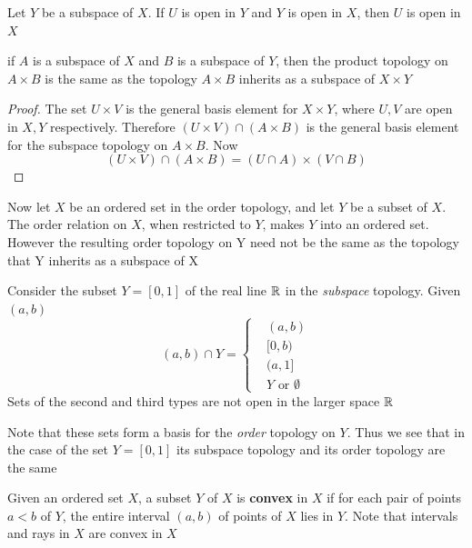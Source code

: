 \documentclass[11pt]{article}
\begin{document}
\begin{lemma}[]
Let \(Y\) be a subspace of \(X\). If \(U\) is open in \(Y\) and \(Y\) is open in \(X\),
then \(U\) is open in \(X\)
\end{lemma}

\begin{theorem}[]
if \(A\) is a subspace of \(X\) and \(B\) is a subspace of \(Y\), then the product topology
on \(A\times B\) is the same as the topology \(A\times B\) inherits as a subspace of \(X\times Y\)
\end{theorem}

\begin{proof}
The set \(U\times V\) is the general basis element for \(X\times Y\), where \(U,V\) are open in \(X,Y\)
respectively.  Therefore \((U\times V)\cap(A\times B)\) is the general basis element for the subspace
topology on \(A\times B\). Now
 \begin{equation*}
(U\times V)\cap(A\times B)=(U\cap A)\times (V\cap B)
 \end{equation*}
\end{proof}

Now let \(X\) be an ordered set in the order topology, and let \(Y\) be a subset of \(X\). The
order relation on \(X\), when restricted to \(Y\), makes \(Y\) into an ordered set. However the
resulting order topology on Y need not be the same as the topology that Y inherits as a subspace
of X

\begin{examplle}[]
Consider the subset \(Y=[0,1]\) of the real line \(\mathbb{R}\) in the \emph{subspace} topology. Given \((a,b)\)
\begin{equation*}
(a,b)\cap Y=
\begin{cases}
&(a,b)\\
&[0,b)\\
&(a,1]\\
&Y\text{ or }\emptyset
\end{cases}
\end{equation*}
Sets of the second and third types are not open in the larger space \(\mathbb{R}\)

Note that these sets form a basis for the \emph{order}  topology on \(Y\). Thus we see that in the case
of the set \(Y=[0,1]\) its subspace topology and its order topology are the same
\end{examplle}

Given an ordered set \(X\), a subset \(Y\) of \(X\) is \textbf{convex} in \(X\) if for each pair of
points \(a<b\) of \(Y\), the entire interval \((a,b)\) of points of \(X\) lies in \(Y\). Note
that intervals and rays in \(X\) are convex in \(X\)
\end{document}
